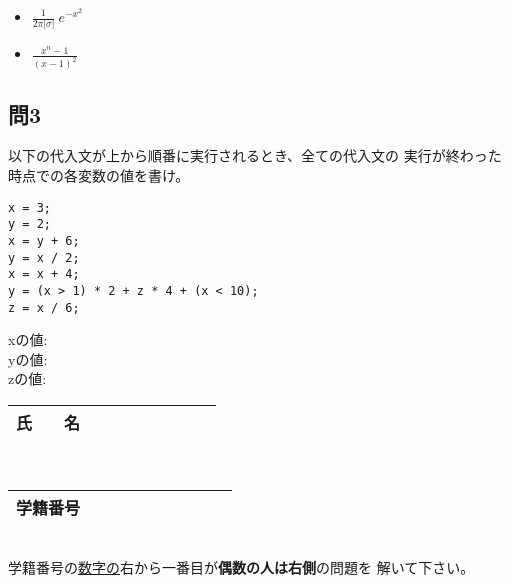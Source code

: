 \documentclass[a4j]{jarticle}
\def\ds{\displaystyle}
\begin{document}
\begin{multicols*}{2}
\begin{itemize}
 \item $\frac{1}{2\pi|\sigma|}
       \ e^{-x^2}$

       \quad \rule[-3ex]{0pt}{6ex}
       \quad {}

       \quad \rule[-3ex]{0pt}{6ex}



 \item $\ds\frac{x^n-1}{(x-1)^2}$

      \quad \rule[-3ex]{0pt}{6ex}

\end{itemize}





\subsection*{問3}

以下の代入文が上から順番に実行されるとき、全ての代入文の
実行が終わった時点での各変数の値を書け。

\begin{verbatim}
x = 3;
y = 2;
x = y + 6;
y = x / 2;
x = x + 4;
y = (x > 1) * 2 + z * 4 + (x < 10);
z = x / 6;
\end{verbatim}


{\ttfamily x}の値:\\

{\ttfamily y}の値:\\

{\ttfamily z}の値:\\





\vfill







\noindent
\begin{tabular}[t]{|c|cccccccc|}\hline
氏　　名 & & & & & & & & \\ \hline
\end{tabular}\\
\begin{tabular}[t]{|c|c|c|c|c|c|c|c|c|c|}\hline
学籍番号 & & & & & & & & \\ \hline
\end{tabular}\\
学籍番号の\underline{数字の}右から一番目が{\bfseries 偶数の人は右側}の問題を
解いて下さい。
\vspace{-5ex}






\end{multicols*}
\end{document}
